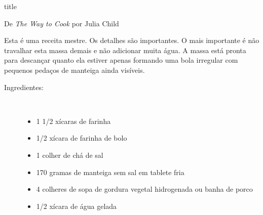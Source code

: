 \documentclass [11pt, letterpaper] {article}
\begin{document}
 {title}

\begin {flushright}
De {\it The Way to Cook} por Julia Child
\end {flushright}

Esta é uma receita mestre. Os detalhes são importantes. O mais importante é não travalhar esta massa demais e não adicionar muita água. A massa est\'a pronta para descan\c{c}ar quanto ela estiver apenas formando uma bola irregular com pequenos pedaços de manteiga ainda vis\'iveis.
 
\begin {description}

\item [Ingredientes:] \ \\
\begin {itemize}
\item 1 1/2 xícaras de farinha 
\item 1/2 xícara de farinha de bolo
\item 1 colher de chá de sal
\item 170 gramas de manteiga sem sal em tablete fria
\item 4 colheres de sopa de gordura vegetal hidrogenada  ou banha de porco
\item 1/2 xícara de água gelada
\end {itemize}


\end{description}
\end{document}
